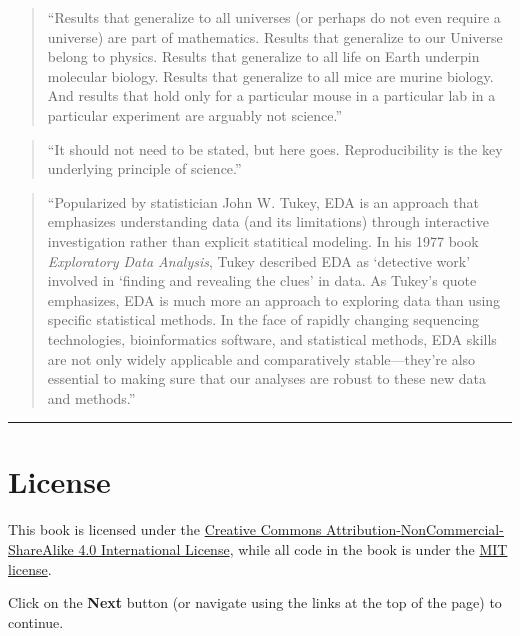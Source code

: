 \documentclass[]{tufte-book}
\begin{document}
\begin{quote}
``Results that generalize to all universes (or perhaps do not even require a
universe) are part of mathematics. Results that generalize to our Universe belong
to physics. Results that generalize to all life on Earth underpin molecular
biology. Results that generalize to all mice are murine biology. And results that
hold only for a particular mouse in a particular lab in a particular experiment
are arguably not science.'' \citep{stark2018before}
\end{quote}

\begin{quote}
``It should not need to be stated, but here goes. Reproducibility is the key
underlying principle of science.'' \citep{gibb2014reproducibility}
\end{quote}

\begin{quote}
``Popularized by statistician John W. Tukey, EDA is an approach that emphasizes
understanding data (and its limitations) through interactive investigation
rather than explicit statitical modeling. In his 1977 book \emph{Exploratory Data
Analysis}, Tukey described EDA as `detective work' involved in `finding and
revealing the clues' in data. As Tukey's quote emphasizes, EDA is much more an approach
to exploring data than using specific statistical methods. In the face of rapidly
changing sequencing technologies, bioinformatics software, and statistical methods,
EDA skills are not only widely applicable and comparatively stable---they're also
essential to making sure that our analyses are robust to these new data and methods.''
\citep{buffalo2015bioinformatics}
\end{quote}

\begin{center}\rule{0.5\linewidth}{0.5pt}\end{center}

\section{License}\label{license}

This book is licensed under the \href{https://creativecommons.org/licenses/by-nc-sa/4.0/}{Creative Commons
Attribution-NonCommercial-ShareAlike 4.0 International
License}, while all code in
the book is under the \href{https://opensource.org/licenses/MIT}{MIT license}.

Click on the \textbf{Next} button (or navigate using the
links at the top of the page) to continue.
\end{document}
